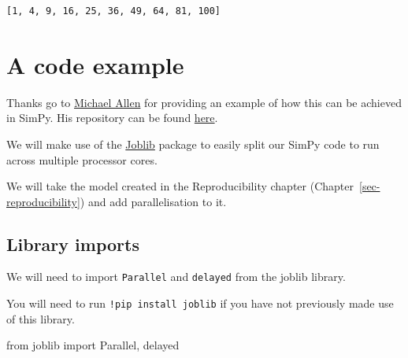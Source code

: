 \documentclass[
  letterpaper,
  DIV=11,
  numbers=noendperiod]{scrreprt}
\newenvironment{Shaded}{\begin{snugshade}}{\end{snugshade}}
\newcommand{\ImportTok}[1]{\textcolor[rgb]{0.00,0.46,0.62}{#1}}
\newcommand{\NormalTok}[1]{\textcolor[rgb]{0.00,0.23,0.31}{#1}}
\begin{document}
\begin{verbatim}
[1, 4, 9, 16, 25, 36, 49, 64, 81, 100]
\end{verbatim}

\section{A code example}\label{a-code-example-2}

\begin{tcolorbox}[enhanced jigsaw, rightrule=.15mm, colback=white, colframe=quarto-callout-note-color-frame, colbacktitle=quarto-callout-note-color!10!white, toprule=.15mm, coltitle=black, opacityback=0, titlerule=0mm, bottomtitle=1mm, breakable, title=\textcolor{quarto-callout-note-color}{\faInfo}\hspace{0.5em}{Note}, opacitybacktitle=0.6, toptitle=1mm, arc=.35mm, bottomrule=.15mm, leftrule=.75mm, left=2mm]

Thanks go to \href{https://orcid.org/0000-0002-8746-9957}{Michael Allen}
for providing an example of how this can be achieved in SimPy. His
repository can be found
\href{https://github.com/MichaelAllen1966/2004_simple_simpy_parallel}{here}.

\end{tcolorbox}

We will make use of the
\href{https://joblib.readthedocs.io/en/latest/parallel.html}{Joblib}
package to easily split our SimPy code to run across multiple processor
cores.

We will take the model created in the Reproducibility chapter
(Chapter~\ref{sec-reproducibility}) and add parallelisation to it.

\subsection{Library imports}\label{library-imports}

We will need to import \texttt{Parallel} and \texttt{delayed} from the
joblib library.

You will need to run \texttt{!pip\ install\ joblib} if you have not
previously made use of this library.

\begin{Shaded}
\begin{Highlighting}[]
\ImportTok{from}\NormalTok{ joblib }\ImportTok{import}\NormalTok{ Parallel, delayed}
\end{Highlighting}
\end{Shaded}
\end{document}
